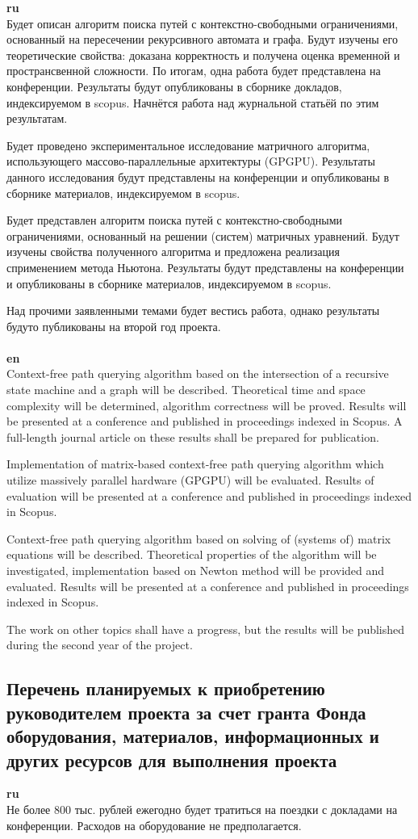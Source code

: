 \documentclass[12pt]{article}  %
\theoremstyle{remark}
\begin{document}
\textbf{ru}\\
%
Будет описан алгоритм поиска путей с контекстно-свободными ограничениями, основанный на пересечении рекурсивного автомата и графа. Будут изучены его теоретические свойства: доказана корректность и получена оценка временной и пространсвенной сложности.
По итогам, одна работа будет представлена на конференции. Результаты будут опубликованы в сборнике докладов, индексируемом в scopus.
Начнётся работа над журнальной статьёй по этим результатам.

Будет проведено экспериментальное исследование матричного алгоритма, использующего массово-параллельные архитектуры (GPGPU).
Результаты данного исследования будут представлены на конференции и опубликованы в сборнике материалов, индексируемом в scopus.

Будет представлен алгоритм поиска путей с контекстно-свободными ограничениями, основанный на решении (систем) матричных уравнений.
Будут изучены свойства полученного алгоритма и предложена реализация сприменением метода Ньютона.
Результаты будут представлены на конференции и опубликованы в сборнике материалов, индексируемом в scopus.

Над прочими заявленными темами будет вестись работа, однако результаты будуто публикованы на второй год проекта.
\\
\\
\textbf{en}\\
Context-free path querying algorithm based on the intersection of a recursive state machine and a graph will be described.
Theoretical time and space complexity will be determined, algorithm correctness will be proved.
Results will be presented at a conference and published in proceedings indexed in Scopus.
A full-length journal article on these results shall be prepared for publication.

Implementation of matrix-based context-free path querying algorithm which utilize massively parallel hardware (GPGPU) will be evaluated.
Results of evaluation will be presented at a conference and published in proceedings indexed in Scopus.

Context-free path querying algorithm based on solving of (systems of) matrix equations will be described.
Theoretical properties of the algorithm will be investigated, implementation based on Newton method will be provided and evaluated.
Results will be presented at a conference and published in proceedings indexed in Scopus.

The work on other topics shall have a progress, but the results will be published during the second year of the project.

\subsection{Перечень планируемых к приобретению руководителем проекта за счет гранта Фонда оборудования, материалов, информационных и других ресурсов для выполнения проекта}

\textbf{ru}\\
%
Не более 800 тыс. рублей ежегодно будет тратиться на поездки с докладами на конференции. Расходов на оборудование не предполагается.
\end{document}
